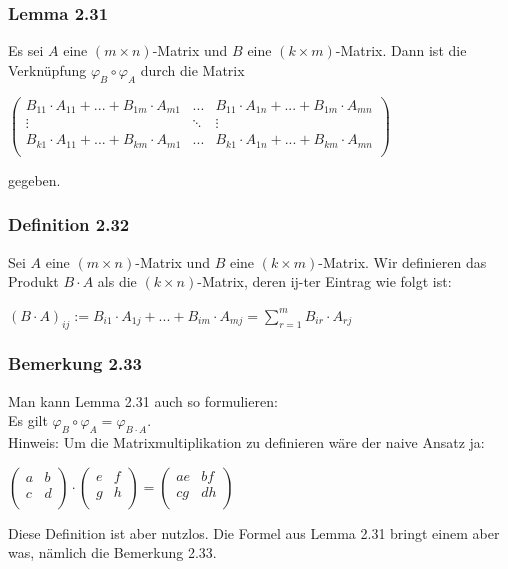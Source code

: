 \documentclass{article}
\DeclareMathOperator*{\sumop}{\sum}
\begin{document}
\subsubsection*{Lemma 2.31}
Es sei $A$ eine $(m \times n)$-Matrix und $B$ eine $(k \times m)$-Matrix. Dann ist die Verknüpfung $\varphi_B \circ \varphi_A$ durch die Matrix \\
\begin{center}
    $\begin{pmatrix}
        B_{11} \cdot A_{11} + ... + B_{1m} \cdot A_{m1} & ... & B_{11} \cdot A_{1n} + ... + B_{1m} \cdot A_{mn} \\
        \vdots & \ddots & \vdots \\
        B_{k1} \cdot A_{11} + ... + B_{km} \cdot A_{m1} & ... & B_{k1} \cdot A_{1n} + ... + B_{km} \cdot A_{mn} \\
    \end{pmatrix}$
\end{center}
gegeben. 
\\
\subsubsection*{Definition 2.32}
Sei $A$ eine $(m \times n)$-Matrix und $B$ eine $(k \times m)$-Matrix. Wir definieren das Produkt $B \cdot A$ als die $(k \times n)$-Matrix, deren ij-ter Eintrag wie folgt ist: \\
\begin{center}
    $(B \cdot A)_{ij} := B_{i1} \cdot A_{1j} + ... + B_{im} \cdot A_{mj} = \displaystyle\sumop_{r=1}^m B_{ir} \cdot A_{rj}$ \\
\end{center}

\subsubsection*{Bemerkung 2.33}
Man kann Lemma 2.31 auch so formulieren: \\
Es gilt $\varphi_B \circ \varphi_A = \varphi_{B \cdot A}$. \\
Hinweis: 
Um die Matrixmultiplikation zu definieren wäre der naive Ansatz ja: 
\begin{center}
    $\begin{pmatrix}
        a & b \\
        c & d \\
    \end{pmatrix} \cdot \begin{pmatrix}
        e & f \\
        g & h \\
    \end{pmatrix} = \begin{pmatrix}
        ae & bf \\
        cg & dh \\
    \end{pmatrix}$
\end{center}
Diese Definition ist aber nutzlos. Die Formel aus Lemma 2.31 bringt einem aber was, nämlich die Bemerkung 2.33. 
\\
\end{document}
